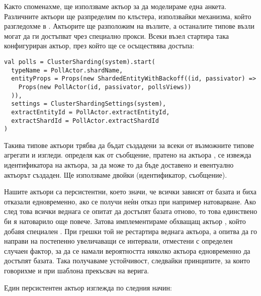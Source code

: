 Както споменахме, ще използваме актьор за да моделираме една анкета. Различните актьори ще разпределим по клъстера, използвайки механизма, който разгледохме в . Актьорите ще разположим на  възлите, а останалите типове възли могат да ги достъпват чрез специално прокси. Всеки  възел стартира така конфигуриран актьор, през който ще се осъществява достъпа:

\begin{lstlisting}
val polls = ClusterSharding(system).start(
  typeName = PollActor.shardName,
  entityProps = Props(new ShardedEntityWithBackoff((id, passivator) =>
    Props(new PollActor(id, passivator, pollsViews))
  )),
  settings = ClusterShardingSettings(system),
  extractEntityId = PollActor.extractEntityId,
  extractShardId = PollActor.extractShardId
)
\end{lstlisting}

Такива типове актьори трябва да бъдат създадени за всеки от възможните типове агрегати и изгледи.  определя как от съобщение, пратено на актьора , се извежда идентификатора на актьора, за да може то да бъде доставено и евентуално актьорът създаден. Ще използваме двойки (идентификатор, съобщение).

Нашите актьори са персистентни, което значи, че всички зависят от базата и биха отказали едновременно, ако се получи неѝн отказ при например натоварване. Ако след това всички веднага се опитат да достъпят базата отново, то това единствено би я натоварило още повече. Затова имплементираме обхващащ актьор , който добавя специален . При грешки той не рестартира веднага актьора, а опитва да го направи на постепенно увеличаващи се интервали, отместени с определен случаен фактор, за да се намали вероятността няколко актьора едновременно да достъпят базата. Така получаваме устойчивост, следвайки принципите, за които говорихме и при шаблона прекъсвач на верига.

Един персистентен актьор изглежда по следния начин:

